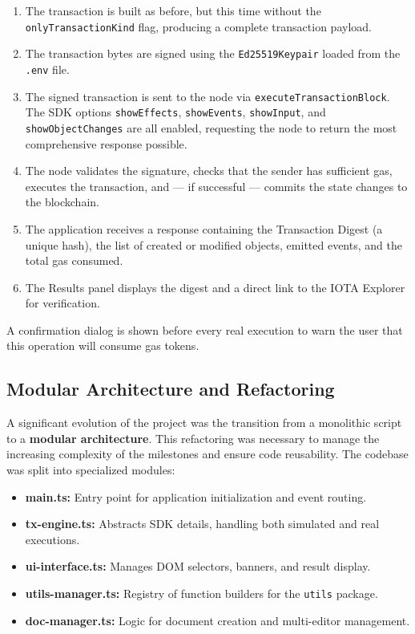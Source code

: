 \documentclass[12pt,a4paper]{article}
\begin{document}
\begin{enumerate}
    \item The transaction is built as before, but this time without the \texttt{onlyTransactionKind} flag, producing a complete transaction payload.
    \item The transaction bytes are signed using the \texttt{Ed25519Keypair} loaded from the \texttt{.env} file.
    \item The signed transaction is sent to the node via \texttt{executeTransactionBlock}. The SDK options \texttt{showEffects}, \texttt{showEvents}, \texttt{showInput}, and \texttt{showObjectChanges} are all enabled, requesting the node to return the most comprehensive response possible.
    \item The node validates the signature, checks that the sender has sufficient gas, executes the transaction, and --- if successful --- commits the state changes to the blockchain.
    \item The application receives a response containing the Transaction Digest (a unique hash), the list of created or modified objects, emitted events, and the total gas consumed.
    \item The Results panel displays the digest and a direct link to the IOTA Explorer for verification.
\end{enumerate}

A confirmation dialog is shown before every real execution to warn the user that this operation will consume gas tokens.


\subsection{Modular Architecture and Refactoring}

A significant evolution of the project was the transition from a monolithic script to a \textbf{modular architecture}. This refactoring was necessary to manage the increasing complexity of the milestones and ensure code reusability. The codebase was split into specialized modules:

\begin{itemize}
    \item \textbf{main.ts:} Entry point for application initialization and event routing.
    \item \textbf{tx-engine.ts:} Abstracts SDK details, handling both simulated and real executions.
    \item \textbf{ui-interface.ts:} Manages DOM selectors, banners, and result display.
    \item \textbf{utils-manager.ts:} Registry of function builders for the \texttt{utils} package.
    \item \textbf{doc-manager.ts:} Logic for document creation and multi-editor management.
\end{itemize}
\end{document}
